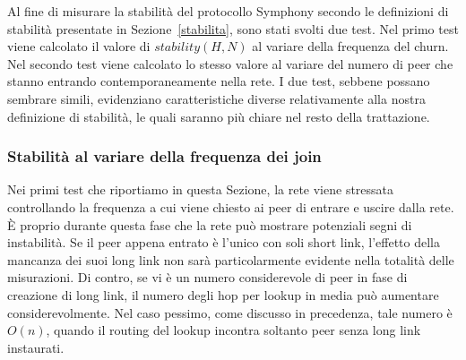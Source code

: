 \documentclass[prodmode,acmtap]{acmlarge}
\begin{document}
Al fine di misurare la stabilità del protocollo Symphony secondo le definizioni di stabilità presentate in Sezione~\ref{stabilita}, sono stati svolti due test. Nel primo test viene calcolato il valore di $stability(H,N)$ al variare della frequenza del churn. Nel secondo test viene calcolato lo stesso valore al variare del numero di peer che stanno entrando contemporaneamente nella rete. I due test, sebbene possano sembrare simili, evidenziano caratteristiche diverse relativamente alla nostra definizione di stabilità, le quali saranno più chiare nel resto della trattazione.


\subsubsection{Stabilità al variare della frequenza dei join}

Nei primi test che riportiamo in questa Sezione, la rete viene stressata controllando la frequenza a cui viene chiesto ai peer di entrare e uscire dalla rete.
È proprio durante questa fase che la rete può mostrare potenziali segni di instabilità. Se il peer appena entrato è l'unico con soli short link, l'effetto della mancanza dei suoi long link non sarà particolarmente evidente nella totalità delle misurazioni.
Di contro, se vi è un numero considerevole di peer in fase di creazione di long link, il numero degli hop per lookup in media può aumentare considerevolmente. Nel caso pessimo, come discusso in precedenza, tale numero è $O(n)$, quando il routing del lookup incontra soltanto peer senza long link instaurati.
\end{document}
